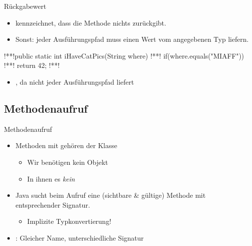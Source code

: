 \begin{frame}[fragile,c]{Rückgabewert}
   \begin{itemize}[<+(1)->]
      \itemsep11pt
      \item {} kennzeichnet, dass die Methode nichts zurückgibt.
      \item Sonst: jeder Ausführungspfad muss einen Wert vom angegebenen Typ liefern.
   \end{itemize}
\begin{plainjava}
!**!public static int iHaveCatPics(String where) {
!**!   if(where.equals("MIAFF"))
!**!      return 42;
!**!}
\end{plainjava}
   \begin{itemize}
      \item<6-> , da nicht jeder Ausführungspfad  liefert
   \end{itemize}
\end{frame}

\subsection{Methodenaufruf}
\begin{frame}[c]{Methodenaufruf}
   \begin{itemize}[<+(1)->]
      \itemsep11pt
      \item Methoden mit  gehören der Klasse \begin{itemize}
         \item Wir benötigen kein Objekt
         \item In ihnen  es \textit{kein} 
      \end{itemize}
      \item Java sucht beim Aufruf eine (sichtbare \& gültige) Methode mit entsprechender Signatur. \begin{itemize}
         \item Implizite Typkonvertierung!
      \end{itemize}
      \item {}: Gleicher Name, unterschiedliche Signatur
   \end{itemize}
\end{frame}

